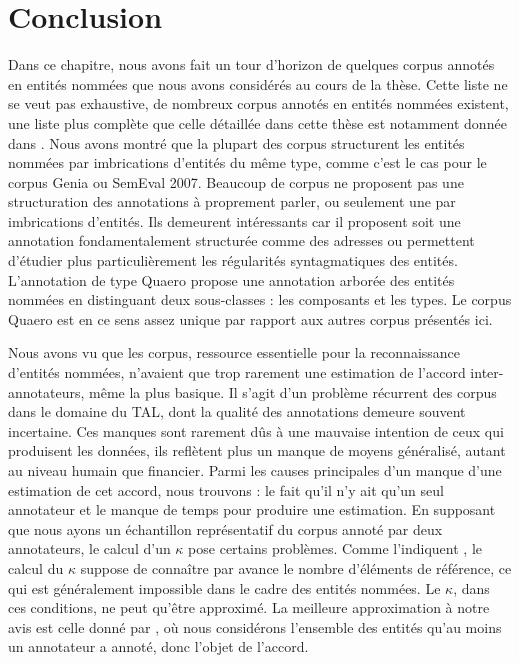 \documentclass[12pt,a4paper,times,twoside,openright]{report}
\begin{document}
    \section{Conclusion}
    \label{sec:corpus-conclusion}
Dans ce chapitre, nous avons fait un tour d'horizon de quelques corpus annotés en entités nommées que nous avons considérés au cours de la thèse. Cette liste ne se veut pas exhaustive, de nombreux corpus annotés en entités nommées existent, une liste plus complète que celle détaillée dans cette thèse est notamment donnée dans \citet{rosen2015survey}. Nous avons montré que la plupart des corpus structurent les entités nommées par imbrications d'entités du même type, comme c'est le cas pour le corpus Genia ou SemEval 2007. Beaucoup de corpus ne proposent pas une structuration des annotations à proprement parler, ou seulement une par imbrications d'entités. Ils demeurent intéressants car il proposent soit une annotation fondamentalement structurée comme des adresses ou permettent d'étudier plus particulièrement les régularités syntagmatiques des entités. L'annotation de type Quaero propose une annotation arborée des entités nommées en distinguant deux sous-classes : les composants et les types. Le corpus Quaero est en ce sens assez unique par rapport aux autres corpus présentés ici.

Nous avons vu que les corpus, ressource essentielle pour la reconnaissance d'entités nommées, n'avaient que trop rarement une estimation de l'accord inter-annotateurs, même la plus basique. Il s'agit d'un problème récurrent des corpus dans le domaine du TAL, dont la qualité des annotations demeure souvent incertaine. Ces manques sont rarement dûs à une mauvaise intention de ceux qui produisent les données, ils reflètent plus un manque de moyens généralisé, autant au niveau humain que financier. Parmi les causes principales d'un manque d'une estimation de cet accord, nous trouvons : le fait qu'il n'y ait qu'un seul annotateur et le manque de temps pour produire une estimation. En supposant que nous ayons un échantillon représentatif du corpus annoté par deux annotateurs, le calcul d'un $\kappa$ pose certains problèmes. Comme l'indiquent \citet{alex2010agile,grouin2011proposal}, le calcul du $\kappa$ suppose de connaître par avance le nombre d'éléments de référence, ce qui est généralement impossible dans le cadre des entités nommées. Le $\kappa$, dans ces conditions, ne peut qu'être approximé. La meilleure approximation à notre avis est celle donné par \citet{grouin2011proposal}, où nous considérons l'ensemble des entités qu'au moins un annotateur a annoté, donc l'objet de l'accord.
\end{document}

